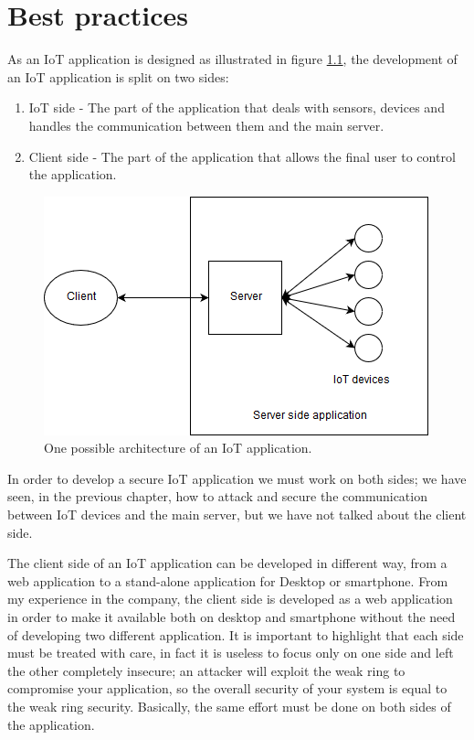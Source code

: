 \chapter{Best practices}\label{ch:best}
As an IoT application is designed as illustrated in figure \ref{fig:best0}, the development of an IoT application is split on two sides:
\begin{enumerate}
	\item IoT side - The part of the application that deals with sensors, devices and handles the communication between them and the main server.
	\item Client side - The part of the application that allows the final user to control the application.
\end{enumerate}


	\begin{figure}
	\includegraphics[width=\linewidth]{bestpractice-img0.png}
	\caption{One possible architecture of an IoT application.}
	\label{fig:best0}
\end{figure}

In order to develop a secure IoT application we must work on both sides; we have seen, in the previous chapter, how to attack and secure the communication between IoT devices and the main server, but we have not talked about the client side.\newline

The client side of an IoT application can be developed in different way, from a web application to a stand-alone application for Desktop or smartphone.\newline
From my experience in the company, the client side is developed as a web application in order to make it available both on desktop and smartphone without the need of developing two different application.\newline
It is important to highlight that each side must be treated with care, in fact it is useless to focus only on one side and left the other completely insecure; an attacker will exploit the weak ring to compromise your application, so the overall security of your system is equal to the weak ring security.\newline
Basically, the same effort must be done on both sides of the application.\newline

